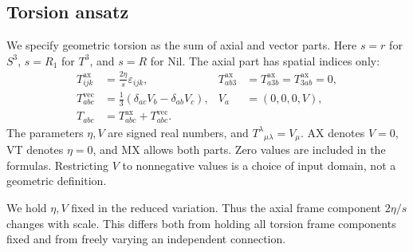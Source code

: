 \subsection{Torsion ansatz}
We specify geometric torsion as the sum of axial and vector parts.
Here $s=r$ for $S^3$, $s=R_1$ for $T^3$, and $s=R$ for Nil.
The axial part has spatial indices only:
\begin{equation}
\begin{aligned}
T^{\mathrm{ax}}_{ijk}&=\frac{2\eta}{s}\varepsilon_{ijk},
&T^{\mathrm{ax}}_{ab3}&=T^{\mathrm{ax}}_{a3b}=T^{\mathrm{ax}}_{3ab}=0,\\
T^{\mathrm{vec}}_{abc}&=\frac13(\delta_{ac}V_b-\delta_{ab}V_c),
&V_a&=(0,0,0,V),\\
T_{abc}&=T^{\mathrm{ax}}_{abc}+T^{\mathrm{vec}}_{abc}.
\end{aligned}
\tag{M2-05}\label{eq:M2-05}
\end{equation}
The parameters $\eta,V$ are signed real numbers, and
$T^\lambda{}_{\mu\lambda}=V_\mu$.
AX denotes $V=0$, VT denotes $\eta=0$, and MX allows both parts.
Zero values are included in the formulas. Restricting $V$ to
nonnegative values is a choice of input domain, not a geometric definition.

We hold $\eta,V$ fixed in the reduced variation. Thus the axial frame
component $2\eta/s$ changes with scale. This differs both from holding
all torsion frame components fixed and from freely varying an independent
connection.


